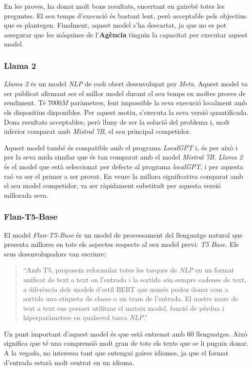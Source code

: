 En les proves, ha donat molt bons resultats, encertant en gairebé totes les preguntes. El seu temps d'execució és bastant lent, però acceptable pels objectius que es plantegen. Finalment, aquest model s'ha descartat, ja que no es pot assegurar que les màquines de l'\textbf{Agència} tinguin la capacitat per executar aquest model.


\subsubsection{Llama 2}
\textit{Llama 2} \cite{llama} és un model \textit{NLP} de codi obert desenvolupat per \textit{Meta}. Aquest model va ser publicat afirmant ser el millor model durant el seu temps en moltes proves de rendiment. Té $7000M$ paràmetres, fent impossible la seva execució localment amb els dispositius disponibles. Per aquest motiu, s'executa la seva versió quantificada. Dona resultats acceptables, però lluny de ser la solució del problema i, molt inferior comparat amb \textit{Mistral 7B}, el seu principal competidor.

Aquest model també és compatible amb el programa \textit{LocalGPT} \cite{localgpt} i, és per això i per la seva mida similar que és tan comparat amb el model \textit{Mistral 7B}. \textit{Llama 2} és el model que està seleccionat per defecte al programa \textit{localGPT}, i per aquesta raó va ser el primer a ser provat. En veure la millora significativa comparat amb el seu model competidor, va ser ràpidament substituït per aquesta versió millorada seva.


\subsubsection{Flan-T5-Base}
El model \textit{Flan-T5-Base} \cite{flan-t5} és un model de processament del llenguatge natural que presenta millores en tots els aspectes respecte al seu model previ: \textit{T5 Base}. Els seus desenvolupadors van escriure: 
\begin{quote}
``Amb T5, proposem reformular totes les tasques de \textit{NLP} en un format unificat de text a text on l'entrada i la sortida són sempre cadenes de text, a diferència dels models d'estil BERT que només poden donar com a sortida una etiqueta de classe o un tram de l'entrada. El nostre marc de text a text ens permet utilitzar el mateix model, funció de pèrdua i hiperparàmetres en qualsevol tasca \textit{NLP}.''
\end{quote}

Un punt important d'aquest model és que està entrenat amb 60 llenguatges. Això significa que té una comprensió molt gran de tots els texts que se li puguin donar. A la vegada, no interessa tant que entengui gaires idiomes, ja que el format d'entrada estarà molt centrat en un idioma.

